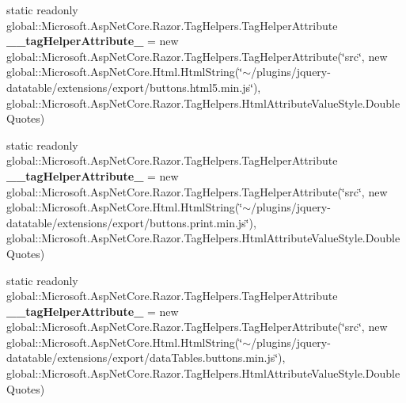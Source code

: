 \begin{DoxyCompactItemize}
\item 
\mbox{\label{class_asp_net_core_1_1_views___movements___index_aeee1012a1e92496ad3f23a9b96eead1d}} 
static readonly global\+::\+Microsoft.\+Asp\+Net\+Core.\+Razor.\+Tag\+Helpers.\+Tag\+Helper\+Attribute {\bfseries \+\_\+\+\_\+tag\+Helper\+Attribute\+\_} = new global\+::\+Microsoft.\+Asp\+Net\+Core.\+Razor.\+Tag\+Helpers.\+Tag\+Helper\+Attribute(\char`\"{}src\char`\"{}, new global\+::\+Microsoft.\+Asp\+Net\+Core.\+Html.\+Html\+String(\char`\"{}$\sim$/plugins/jquery-\/datatable/extensions/export/buttons.\+html5.\+min.\+js\char`\"{}), global\+::\+Microsoft.\+Asp\+Net\+Core.\+Razor.\+Tag\+Helpers.\+Html\+Attribute\+Value\+Style.\+Double\+Quotes)
\item 
\mbox{\label{class_asp_net_core_1_1_views___movements___index_a05738e7ec5ee6e8a0c545f20e405446c}} 
static readonly global\+::\+Microsoft.\+Asp\+Net\+Core.\+Razor.\+Tag\+Helpers.\+Tag\+Helper\+Attribute {\bfseries \+\_\+\+\_\+tag\+Helper\+Attribute\+\_} = new global\+::\+Microsoft.\+Asp\+Net\+Core.\+Razor.\+Tag\+Helpers.\+Tag\+Helper\+Attribute(\char`\"{}src\char`\"{}, new global\+::\+Microsoft.\+Asp\+Net\+Core.\+Html.\+Html\+String(\char`\"{}$\sim$/plugins/jquery-\/datatable/extensions/export/buttons.\+print.\+min.\+js\char`\"{}), global\+::\+Microsoft.\+Asp\+Net\+Core.\+Razor.\+Tag\+Helpers.\+Html\+Attribute\+Value\+Style.\+Double\+Quotes)
\item 
\mbox{\label{class_asp_net_core_1_1_views___movements___index_abeaec31dd8052b2269dfad10a13bb463}} 
static readonly global\+::\+Microsoft.\+Asp\+Net\+Core.\+Razor.\+Tag\+Helpers.\+Tag\+Helper\+Attribute {\bfseries \+\_\+\+\_\+tag\+Helper\+Attribute\+\_} = new global\+::\+Microsoft.\+Asp\+Net\+Core.\+Razor.\+Tag\+Helpers.\+Tag\+Helper\+Attribute(\char`\"{}src\char`\"{}, new global\+::\+Microsoft.\+Asp\+Net\+Core.\+Html.\+Html\+String(\char`\"{}$\sim$/plugins/jquery-\/datatable/extensions/export/data\+Tables.\+buttons.\+min.\+js\char`\"{}), global\+::\+Microsoft.\+Asp\+Net\+Core.\+Razor.\+Tag\+Helpers.\+Html\+Attribute\+Value\+Style.\+Double\+Quotes)
\item 
\mbox{\label{class_asp_net_core_1_1_views___movements___index_ad6bae02b774ac8474d4e4f83ab6dbe79}} 

\end{DoxyCompactItemize}
